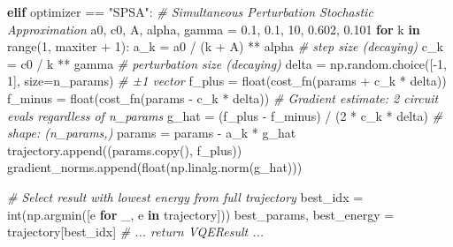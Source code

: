 \documentclass[
  11pt,
]{report}
\newenvironment{Shaded}{}{}
\newcommand{\BuiltInTok}[1]{\textcolor[rgb]{0.00,0.50,0.00}{#1}}
\newcommand{\CommentTok}[1]{\textcolor[rgb]{0.38,0.63,0.69}{\textit{#1}}}
\newcommand{\ControlFlowTok}[1]{\textcolor[rgb]{0.00,0.44,0.13}{\textbf{#1}}}
\newcommand{\DecValTok}[1]{\textcolor[rgb]{0.25,0.63,0.44}{#1}}
\newcommand{\FloatTok}[1]{\textcolor[rgb]{0.25,0.63,0.44}{#1}}
\newcommand{\KeywordTok}[1]{\textcolor[rgb]{0.00,0.44,0.13}{\textbf{#1}}}
\newcommand{\NormalTok}[1]{#1}
\newcommand{\OperatorTok}[1]{\textcolor[rgb]{0.40,0.40,0.40}{#1}}
\newcommand{\StringTok}[1]{\textcolor[rgb]{0.25,0.44,0.63}{#1}}
\begin{document}
\begin{Shaded}
\begin{Highlighting}[]
    \ControlFlowTok{elif}\NormalTok{ optimizer }\OperatorTok{==} \StringTok{"SPSA"}\NormalTok{:}
        \CommentTok{\# Simultaneous Perturbation Stochastic Approximation}
\NormalTok{        a0, c0, A, alpha, gamma }\OperatorTok{=} \FloatTok{0.1}\NormalTok{, }\FloatTok{0.1}\NormalTok{, }\DecValTok{10}\NormalTok{, }\FloatTok{0.602}\NormalTok{, }\FloatTok{0.101}
        \ControlFlowTok{for}\NormalTok{ k }\KeywordTok{in} \BuiltInTok{range}\NormalTok{(}\DecValTok{1}\NormalTok{, maxiter }\OperatorTok{+} \DecValTok{1}\NormalTok{):}
\NormalTok{            a\_k }\OperatorTok{=}\NormalTok{ a0 }\OperatorTok{/}\NormalTok{ (k }\OperatorTok{+}\NormalTok{ A) }\OperatorTok{**}\NormalTok{ alpha       }\CommentTok{\# step size (decaying)}
\NormalTok{            c\_k }\OperatorTok{=}\NormalTok{ c0 }\OperatorTok{/}\NormalTok{ k }\OperatorTok{**}\NormalTok{ gamma             }\CommentTok{\# perturbation size (decaying)}
\NormalTok{            delta }\OperatorTok{=}\NormalTok{ np.random.choice([}\OperatorTok{{-}}\DecValTok{1}\NormalTok{, }\DecValTok{1}\NormalTok{], size}\OperatorTok{=}\NormalTok{n\_params)  }\CommentTok{\# ±1 vector}
\NormalTok{            f\_plus  }\OperatorTok{=} \BuiltInTok{float}\NormalTok{(cost\_fn(params }\OperatorTok{+}\NormalTok{ c\_k }\OperatorTok{*}\NormalTok{ delta))}
\NormalTok{            f\_minus }\OperatorTok{=} \BuiltInTok{float}\NormalTok{(cost\_fn(params }\OperatorTok{{-}}\NormalTok{ c\_k }\OperatorTok{*}\NormalTok{ delta))}
            \CommentTok{\# Gradient estimate: 2 circuit evals regardless of n\_params}
\NormalTok{            g\_hat }\OperatorTok{=}\NormalTok{ (f\_plus }\OperatorTok{{-}}\NormalTok{ f\_minus) }\OperatorTok{/}\NormalTok{ (}\DecValTok{2} \OperatorTok{*}\NormalTok{ c\_k }\OperatorTok{*}\NormalTok{ delta)  }\CommentTok{\# shape: (n\_params,)}
\NormalTok{            params }\OperatorTok{=}\NormalTok{ params }\OperatorTok{{-}}\NormalTok{ a\_k }\OperatorTok{*}\NormalTok{ g\_hat}
\NormalTok{            trajectory.append((params.copy(), f\_plus))}
\NormalTok{            gradient\_norms.append(}\BuiltInTok{float}\NormalTok{(np.linalg.norm(g\_hat)))}

    \CommentTok{\# Select result with lowest energy from full trajectory}
\NormalTok{    best\_idx }\OperatorTok{=} \BuiltInTok{int}\NormalTok{(np.argmin([e }\ControlFlowTok{for}\NormalTok{ \_, e }\KeywordTok{in}\NormalTok{ trajectory]))}
\NormalTok{    best\_params, best\_energy }\OperatorTok{=}\NormalTok{ trajectory[best\_idx]}
    \CommentTok{\# ... return VQEResult ...}
\end{Highlighting}
\end{Shaded}
\end{document}
